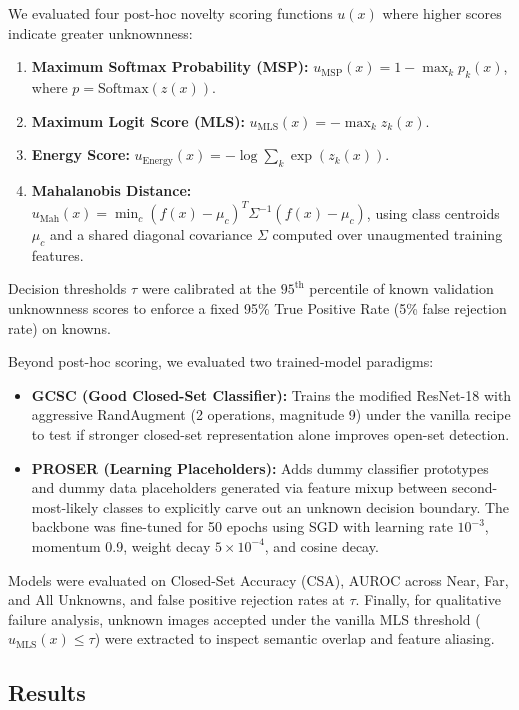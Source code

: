 \documentclass{article}
\begin{document}
We evaluated four post-hoc novelty scoring functions $u(x)$ where higher scores indicate greater unknownness:
\begin{enumerate}
    \item \textbf{Maximum Softmax Probability (MSP):} $u_{\text{MSP}}(x) = 1 - \max_k p_k(x)$, where $p = \text{Softmax}(z(x))$.
    \item \textbf{Maximum Logit Score (MLS):} $u_{\text{MLS}}(x) = -\max_k z_k(x)$.
    \item \textbf{Energy Score:} $u_{\text{Energy}}(x) = -\log \sum_k \exp(z_k(x))$.
    \item \textbf{Mahalanobis Distance:} $u_{\text{Mah}}(x) = \min_c (f(x) - \mu_c)^T \Sigma^{-1} (f(x) - \mu_c)$, using class centroids $\mu_c$ and a shared diagonal covariance $\Sigma$ computed over unaugmented training features.
\end{enumerate}
Decision thresholds $\tau$ were calibrated at the $95^{\text{th}}$ percentile of known validation unknownness scores to enforce a fixed 95\% True Positive Rate (5\% false rejection rate) on knowns.

Beyond post-hoc scoring, we evaluated two trained-model paradigms:
\begin{itemize}
    \item \textbf{GCSC (Good Closed-Set Classifier):} Trains the modified ResNet-18 with aggressive RandAugment (2 operations, magnitude 9) under the vanilla recipe to test if stronger closed-set representation alone improves open-set detection.
    \item \textbf{PROSER (Learning Placeholders):} Adds dummy classifier prototypes and dummy data placeholders generated via feature mixup between second-most-likely classes to explicitly carve out an unknown decision boundary. The backbone was fine-tuned for 50 epochs using SGD with learning rate $10^{-3}$, momentum 0.9, weight decay $5 \times 10^{-4}$, and cosine decay.
\end{itemize}

Models were evaluated on Closed-Set Accuracy (CSA), AUROC across Near, Far, and All Unknowns, and false positive rejection rates at $\tau$. Finally, for qualitative failure analysis, unknown images accepted under the vanilla MLS threshold ($u_{\text{MLS}}(x) \le \tau$) were extracted to inspect semantic overlap and feature aliasing.

\subsection{Results}
\end{document}
